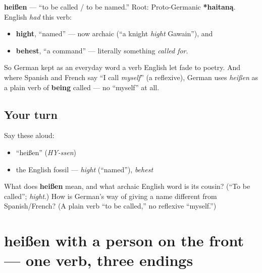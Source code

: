 \begin{cousinweb}
\textbf{heißen} — \textquotedblleft{}to be called / to be named.\textquotedblright{} Root: Proto-Germanic \textbf{*haitaną}. English \emph{had} this verb:

\begin{itemize}
\raggedright
  \item \textbf{hight}, \textquotedblleft{}named\textquotedblright{} — now archaic (\textquotedblleft{}a knight \emph{hight} Gawain\textquotedblright{}), and
  \item \textbf{behest}, \textquotedblleft{}a command\textquotedblright{} — literally something \emph{called for}.
\end{itemize}

So German kept as an everyday word a verb English let fade to poetry. And where Spanish and French say \textquotedblleft{}I call \emph{myself}\textquotedblright{} (a reflexive), German uses \emph{heißen} as a plain verb of \textbf{being} called — no \textquotedblleft{}myself\textquotedblright{} at all.
\end{cousinweb}

\subsection*{Your turn}
Say these aloud:

\begin{itemize}
\raggedright
  \item \textquotedblleft{}heißen\textquotedblright{} (\emph{HY-ssen})
  \item the English fossil — \emph{hight} (\textquotedblleft{}named\textquotedblright{}), \emph{behest}
\end{itemize}

\begin{tcolorbox}[breakable,colback=teal!4,colframe=teal!35!black,title={Before you move on}]
What does \textbf{heißen} mean, and what archaic English word is its cousin? (\textquotedblleft{}To be called\textquotedblright{}; \emph{hight}.) How is German's way of giving a name different from Spanish/French? (A plain verb \textquotedblleft{}to be called,\textquotedblright{} no reflexive \textquotedblleft{}myself.\textquotedblright{})
\end{tcolorbox}
\section[ich heiße / du heißt / Sie heißen]{heißen with a person on the front — one verb, three endings}

